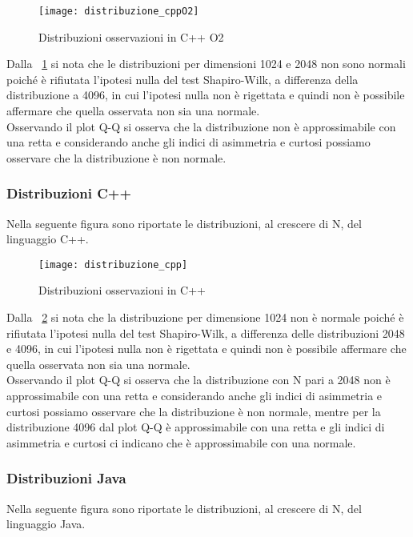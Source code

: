 \begin{figure}[!htbp]
  \texttt{[image: distribuzione\_cppO2]}
  \caption{Distribuzioni osservazioni in C++ O2}
  \label{distribuzione_cppO2}
\end{figure}
Dalla \figurename~\ref{distribuzione_cppO2} si nota
che le distribuzioni per dimensioni 1024 e 2048 non sono normali poiché è rifiutata
l'ipotesi nulla del test Shapiro-Wilk, a differenza della distribuzione a 4096,
in cui l'ipotesi nulla non è rigettata e quindi non è possibile affermare che
quella osservata non sia una normale.\\
Osservando il plot Q-Q si osserva che la distribuzione non è approssimabile con una
retta e considerando anche gli indici di asimmetria e curtosi possiamo osservare che
la distribuzione è non normale.
\clearpage
\subsubsection{Distribuzioni C++ }
Nella seguente figura sono riportate le distribuzioni, al crescere di N, del
linguaggio C++.

\begin{figure}[!htbp]
  \texttt{[image: distribuzione\_cpp]}
  \caption{Distribuzioni osservazioni in C++}
  \label{distribuzione_cpp}
\end{figure}

Dalla \figurename~\ref{distribuzione_cpp} si nota
che la distribuzione per dimensione 1024 non è normale poiché è rifiutata
l'ipotesi nulla del test Shapiro-Wilk, a differenza delle distribuzioni 2048 e
4096, in cui l'ipotesi nulla non è rigettata e quindi non è possibile affermare
che quella osservata non sia una normale.\\
Osservando il plot Q-Q si osserva che la distribuzione con N pari a 2048 non è approssimabile con una
retta e considerando anche gli indici di asimmetria e curtosi possiamo osservare che
la distribuzione è non normale, mentre per la distribuzione 4096 dal plot Q-Q è approssimabile con una retta
e gli indici di asimmetria e curtosi ci indicano che è approssimabile con una normale.\\
\clearpage
\subsubsection{Distribuzioni Java}
Nella seguente figura sono riportate le distribuzioni, al crescere di N, del
linguaggio Java.

